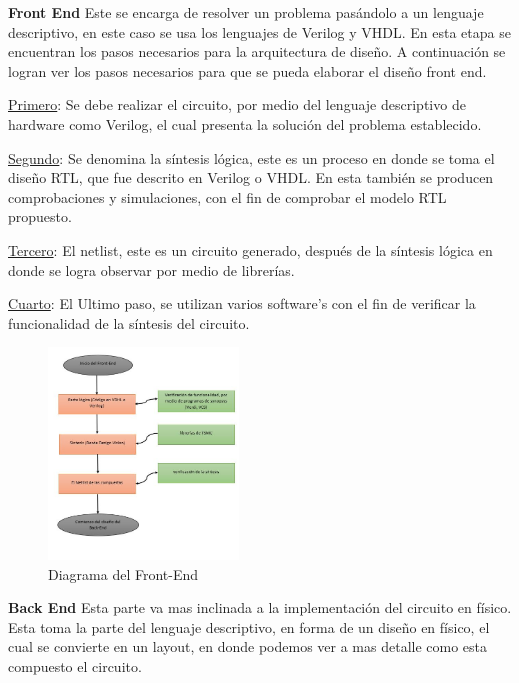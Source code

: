  \textbf{Front End}
 Este se encarga de resolver un problema pasándolo a un lenguaje descriptivo, en este caso se usa los lenguajes de Verilog y VHDL. 
 En esta etapa se encuentran los pasos necesarios para la arquitectura de diseño. A continuación se logran ver los pasos necesarios para que se pueda elaborar el diseño front end.
 
 \underline{Primero}: Se debe realizar el circuito, por medio del lenguaje descriptivo de hardware como Verilog, el cual presenta la solución del problema establecido.
 
 \underline{Segundo}:  Se denomina la síntesis lógica, este es un proceso en donde se toma el diseño RTL, que fue descrito en Verilog o VHDL. En esta también se producen comprobaciones y simulaciones, con el fin de comprobar el modelo RTL propuesto.
 
 \underline{Tercero}: El netlist, este es un circuito generado, después de la síntesis lógica en donde se logra observar  por medio de librerías.
 
 \underline{Cuarto}: El Ultimo paso, se utilizan varios software's con el fin de verificar la funcionalidad de la síntesis del circuito.
 \vspace{80mm}
 \cite{charls} 

 \begin{figure}[t]
    \centering
    \includegraphics[width=0.45\textwidth]{figuras/Font.JPG}
    \caption{Diagrama del Front-End}
    \label{fig:mesh1}
\end{figure}
 
 
 
 
 
  \textbf{Back End} 
Esta parte va mas inclinada a la implementación del circuito en físico. Esta toma la parte del lenguaje descriptivo, en forma de un diseño en físico, el cual se convierte en un layout, en donde podemos ver a mas detalle como esta compuesto el circuito.

